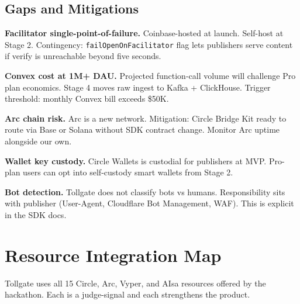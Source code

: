 \documentclass[11pt,a4paper]{article}
\newcommand{\iconShield}{\textcolor{tollgatearc}{\faLock}}
\newcommand{\iconStar}{\textcolor{tollgategold}{\faStar}}
\begin{document}
\subsection{Gaps and Mitigations}

\begin{warnbox}[title={\iconShield~ Known gaps at MVP}]
\textbf{Facilitator single-point-of-failure.} Coinbase-hosted at launch. Self-host at Stage 2. Contingency: \texttt{failOpenOnFacilitator} flag lets publishers serve content if verify is unreachable beyond five seconds.

\textbf{Convex cost at 1M+ DAU.} Projected function-call volume will challenge Pro plan economics. Stage 4 moves raw ingest to Kafka + ClickHouse. Trigger threshold: monthly Convex bill exceeds \$50K.

\textbf{Arc chain risk.} Arc is a new network. Mitigation: Circle Bridge Kit ready to route via Base or Solana without SDK contract change. Monitor Arc uptime alongside our own.

\textbf{Wallet key custody.} Circle Wallets is custodial for publishers at MVP. Pro-plan users can opt into self-custody smart wallets from Stage 2.

\textbf{Bot detection.} Tollgate does not classify bots vs humans. Responsibility sits with publisher (User-Agent, Cloudflare Bot Management, WAF). This is explicit in the SDK docs.
\end{warnbox}

\newpage

\section{Resource Integration Map}

\begin{highlightbox}[title={\iconStar~ Every sponsor tool used, justified}]
Tollgate uses all 15 Circle, Arc, Vyper, and AIsa resources offered by the hackathon. Each is a judge-signal and each strengthens the product.
\end{highlightbox}
\end{document}
